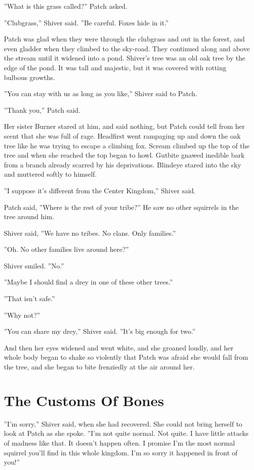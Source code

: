 \documentclass[12pt]{book}
\begin{document}
''What is this grass called?'' Patch asked.

''Clubgrass,'' Shiver said. ''Be careful. Foxes hide in it.''

Patch was glad when they were through the clubgrass and out in the
forest, and even gladder when they climbed to the sky-road. They
continued along and above the stream until it widened into a
pond. Shiver's tree was an old oak tree by the edge of the pond. It
was tall and majestic, but it was covered with rotting bulbous
growths.

''You can stay with us as long as you like,'' Shiver said to Patch.

''Thank you,'' Patch said.

Her sister Burner stared at him, and said nothing, but Patch could
tell from her scent that she was full of rage. Headfirst went
rampaging up and down the oak tree like he was trying to escape a
climbing fox. Scream climbed up the top of the tree and when she
reached the top began to howl. Gutbite gnawed inedible bark from a
branch already scarred by his deprivations. Blindeye stared into the
sky and muttered softly to himself.

''I suppose it's different from the Center Kingdom,'' Shiver said.

Patch said, ''Where is the rest of your tribe?'' He saw no other
squirrels in the tree around him.

Shiver said, ''We have no tribes. No clans. Only families.''

''Oh. No other families live around here?''

Shiver smiled. ''No.''

''Maybe I should find a drey in one of these other trees.''

''That isn't safe.''

''Why not?''

''You can share my drey,'' Shiver said. ''It's big enough for two.''

And then her eyes widened and went white, and she groaned loudly, and
her whole body began to shake so violently that Patch was afraid she
would fall from the tree, and she began to bite frenziedly at the air
around her.


\section{The Customs Of Bones}

''I'm sorry,'' Shiver said, when she had recovered. She could not
bring herself to look at Patch as she spoke. ''I'm not quite
normal. Not quite. I have little attacks of madness like that. It
doesn't happen often. I promise I'm the most normal squirrel you'll
find in this whole kingdom. I'm so sorry it happened in front of
you!''
\end{document}
